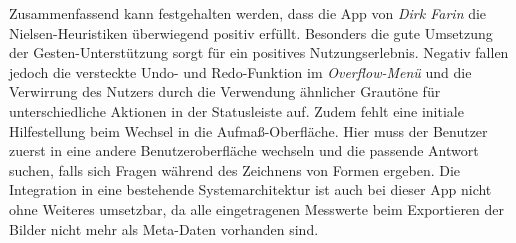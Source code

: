 Zusammenfassend kann festgehalten werden, dass die App \im{} von \emph{Dirk Farin} die Nielsen-Heuristiken überwiegend positiv erfüllt.
Besonders die gute Umsetzung der Gesten-Unterstützung sorgt für ein positives Nutzungserlebnis.
Negativ fallen jedoch die versteckte Undo- und Redo-Funktion im \emph{Overflow-Menü} und die Verwirrung des Nutzers durch die Verwendung ähnlicher Grautöne für unterschiedliche Aktionen in der Statusleiste auf.
Zudem fehlt eine initiale Hilfestellung beim Wechsel in die Aufmaß-Oberfläche.
Hier muss der Benutzer zuerst in eine andere Benutzeroberfläche wechseln und die passende Antwort suchen, falls sich Fragen während des Zeichnens von Formen ergeben.
Die Integration in eine bestehende Systemarchitektur ist auch bei dieser App nicht ohne Weiteres umsetzbar, da alle eingetragenen Messwerte beim Exportieren der Bilder nicht mehr als Meta-Daten vorhanden sind.
